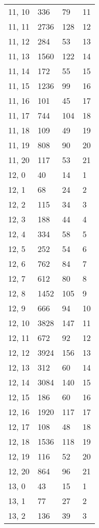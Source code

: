 \begin{table}
\begin{tabular}{llll}
11, 10 &     336 &   79 &    11 \\
11, 11 &    2736 &  128 &    12 \\
11, 12 &     284 &   53 &    13 \\
11, 13 &    1560 &  122 &    14 \\
11, 14 &     172 &   55 &    15 \\
11, 15 &    1236 &   99 &    16 \\
11, 16 &     101 &   45 &    17 \\
11, 17 &     744 &  104 &    18 \\
11, 18 &     109 &   49 &    19 \\
11, 19 &     808 &   90 &    20 \\
11, 20 &     117 &   53 &    21 \\
12, 0  &      40 &   14 &     1 \\
12, 1  &      68 &   24 &     2 \\
12, 2  &     115 &   34 &     3 \\
12, 3  &     188 &   44 &     4 \\
12, 4  &     334 &   58 &     5 \\
12, 5  &     252 &   54 &     6 \\
12, 6  &     762 &   84 &     7 \\
12, 7  &     612 &   80 &     8 \\
12, 8  &    1452 &  105 &     9 \\
12, 9  &     666 &   94 &    10 \\
12, 10 &    3828 &  147 &    11 \\
12, 11 &     672 &   92 &    12 \\
12, 12 &    3924 &  156 &    13 \\
12, 13 &     312 &   60 &    14 \\
12, 14 &    3084 &  140 &    15 \\
12, 15 &     186 &   60 &    16 \\
12, 16 &    1920 &  117 &    17 \\
12, 17 &     108 &   48 &    18 \\
12, 18 &    1536 &  118 &    19 \\
12, 19 &     116 &   52 &    20 \\
12, 20 &     864 &   96 &    21 \\
13, 0  &      43 &   15 &     1 \\
13, 1  &      77 &   27 &     2 \\
13, 2  &     136 &   39 &     3 \\

\end{tabular}
\end{table}
